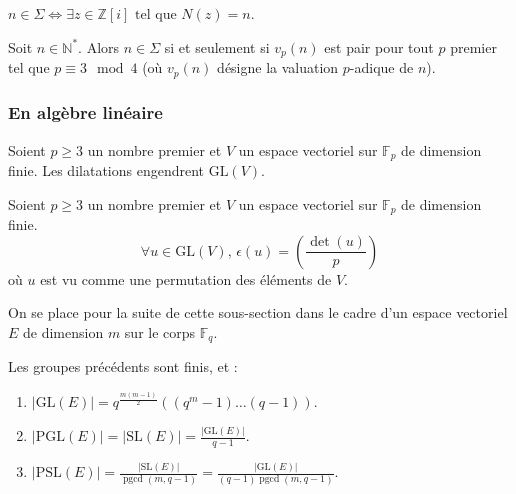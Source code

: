   \begin{remark}
    $n \in \Sigma \iff \exists z \in \mathbb{Z}[i] \text{ tel que } N(z)=n$.
  \end{remark}

  \begin{theorem}
    Soit $n \in \mathbb{N}^*$. Alors $n \in \Sigma$ si et seulement si $v_p(n)$ est pair pour tout $p$ premier tel que $p \equiv 3 \mod 4$ (où $v_p(n)$ désigne la valuation $p$-adique de $n$).
  \end{theorem}

  \subsubsection{En algèbre linéaire}


  \begin{lemma}
    Soient $p \geq 3$ un nombre premier et $V$ un espace vectoriel sur $\mathbb{F}_p$ de dimension finie. Les dilatations engendrent $\mathrm{GL}(V)$.
  \end{lemma}


  \begin{theorem}
    Soient $p \geq 3$ un nombre premier et $V$ un espace vectoriel sur $\mathbb{F}_p$ de dimension finie.
    \[ \forall u \in \mathrm{GL}(V), \, \epsilon(u) = \left( \frac{\det(u)}{p} \right) \]
    où $u$ est vu comme une permutation des éléments de $V$.
  \end{theorem}


  On se place pour la suite de cette sous-section dans le cadre d'un espace vectoriel $E$ de dimension $m$ sur le corps $\mathbb{F}_q$.

  \begin{proposition}
    Les groupes précédents sont finis, et :
    \begin{enumerate}[label={\bfseries(\roman*)}]
      \item $|\mathrm{GL}(E)| = q^{\frac{m(m-1)}{2}}((q^m-1) \dots (q-1))$.
      \item $|\mathrm{PGL}(E)| = |\mathrm{SL}(E)| = \frac{|\mathrm{GL}(E)|}{q-1}$.
      \item $|\mathrm{PSL}(E)| = \frac{|\mathrm{SL}(E)|}{\operatorname{pgcd}(m,q-1)} = \frac{|\mathrm{GL}(E)|}{(q-1)\operatorname{pgcd}(m,q-1)}$.
    \end{enumerate}
  \end{proposition}

